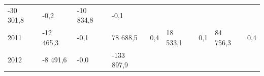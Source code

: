 \begin{longtable}[]{@{}lllllllll@{}}
\begin{minipage}[t]{0.12\columnwidth}
-30 301,8\strut
\end{minipage} & \begin{minipage}[t]{0.06\columnwidth}\raggedright
-0,2\strut
\end{minipage} & \begin{minipage}[t]{0.09\columnwidth}\raggedright
-10 834,8\strut
\end{minipage} & \begin{minipage}[t]{0.06\columnwidth}\raggedright
-0,1\strut
\end{minipage}\tabularnewline
\begin{minipage}[t]{0.05\columnwidth}\raggedright
2011\strut
\end{minipage} & \begin{minipage}[t]{0.10\columnwidth}\raggedright
-12 465,3\strut
\end{minipage} & \begin{minipage}[t]{0.06\columnwidth}\raggedright
-0,1\strut
\end{minipage} & \begin{minipage}[t]{0.16\columnwidth}\raggedright
78 688,5\strut
\end{minipage} & \begin{minipage}[t]{0.06\columnwidth}\raggedright
0,4\strut
\end{minipage} & \begin{minipage}[t]{0.12\columnwidth}\raggedright
18 533,1\strut
\end{minipage} & \begin{minipage}[t]{0.06\columnwidth}\raggedright
0,1\strut
\end{minipage} & \begin{minipage}[t]{0.09\columnwidth}\raggedright
84 756,3\strut
\end{minipage} & \begin{minipage}[t]{0.06\columnwidth}\raggedright
0,4\strut
\end{minipage}\tabularnewline
\begin{minipage}[t]{0.05\columnwidth}\raggedright
2012\strut
\end{minipage} & \begin{minipage}[t]{0.10\columnwidth}\raggedright
-8 491,6\strut
\end{minipage} & \begin{minipage}[t]{0.06\columnwidth}\raggedright
-0,0\strut
\end{minipage} & \begin{minipage}[t]{0.16\columnwidth}\raggedright
-133 897,9\strut
\end{minipage} & \begin{minipage}[t]{0.06\columnwidth}\raggedright

\end{minipage}
\end{longtable}
